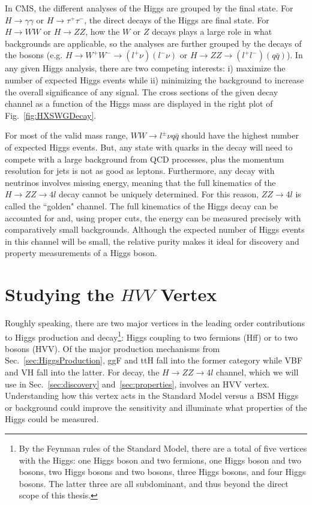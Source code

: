 In CMS, the different analyses of the Higgs are grouped by the final state. For $H\rightarrow \gamma\gamma$ or $H\rightarrow\tau^+\tau^-$, the direct decays of the Higgs are final state. For $H\rightarrow WW$ or $H\rightarrow ZZ$, how the $W$ or $Z$ decays plays a large role in what backgrounds are applicable, so the analyses are further grouped by the decays of the bosons (e.g. $H\rightarrow W^+W^- \rightarrow (l^+\nu)(l^-\nu)$ or $H\rightarrow ZZ \rightarrow (l^+l^-)(q\bar{q})$). In any given Higgs analysis, there are two competing interests: i) maximize the number of expected Higgs events while ii) minimizing the background to increase the overall significance of any signal. The cross sections of the given decay channel as a function of the Higgs mass are displayed in the right plot of Fig.~\ref{fig:HXSWGDecay}.

For most of the valid mass range, $WW\rightarrow l^{\pm}\nu q\bar{q}$ should have the highest number of expected Higgs events. But, any state with quarks in the decay will need to compete with a large background from QCD processes, plus the momentum resolution for jets is not as good as leptons. Furthermore, any decay with neutrinos involves missing energy, meaning that the full kinematics of the $H\rightarrow ZZ\rightarrow 4l$ decay cannot be uniquely determined. For this reason, $ZZ\rightarrow 4l$ is called the ``golden" channel. The full kinematics of the Higgs decay can be accounted for and, using proper cuts, the energy can be measured precisely with comparatively small backgrounds. Although the expected number of Higgs events in this channel will be small, the relative purity makes it ideal for discovery and property measurements of a Higgs boson. 

\section{Studying the $HVV$ Vertex}
\label{sec:HVVVertex}

Roughly speaking, there are two major vertices in the leading order contributions to Higgs production and decay\footnote{By the Feynman rules of the Standard Model, there are a total of five vertices with the Higgs: one Higgs boson and two fermions, one Higgs boson and two bosons, two Higgs bosons and two bosons, three Higgs bosons, and four Higgs bosons. The latter three are all subdominant, and thus beyond the direct scope of this thesis.}: Higgs coupling to two fermions (Hff) or to two bosons (HVV). Of the major production mechanisms from Sec.~\ref{sec:HiggsProduction}, ggF and ttH fall into the former category while VBF and VH fall into the latter. For decay, the $H\rightarrow ZZ \rightarrow 4l$ channel, which we will use in Sec.~\ref{sec:discovery} and~\ref{sec:properties}, involves an HVV vertex. Understanding how this vertex acts in the Standard Model versus a BSM Higgs or background could improve the sensitivity and illuminate what properties of the Higgs could be measured.

